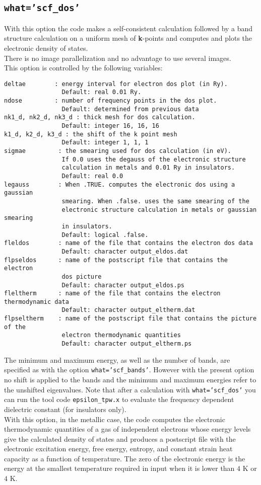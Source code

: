 \documentclass[12pt,a4paper]{article}
\begin{document}
\subsection{\color{web-blue}\texttt{what='scf\_dos'}}
With this option the code makes a self-consistent calculation followed
by a band structure calculation on a uniform mesh of {\bf k}-points and
computes and plots the electronic density of states. \\
There is no image parallelization and no advantage to use several images. \\
This option is controlled by the following variables:
\begin{verbatim} 
deltae        : energy interval for electron dos plot (in Ry).
                Default: real 0.01 Ry.
ndose         : number of frequency points in the dos plot.
                Default: determined from previous data
nk1_d, nk2_d, nk3_d : thick mesh for dos calculation.
                Default: integer 16, 16, 16
k1_d, k2_d, k3_d : the shift of the k point mesh
                Default: integer 1, 1, 1
sigmae         : the smearing used for dos calculation (in eV).
                If 0.0 uses the degauss of the electronic structure
                calculation in metals and 0.01 Ry in insulators.
                Default: real 0.0 
legauss        : When .TRUE. computes the electronic dos using a gaussian
                smearing. When .false. uses the same smearing of the
                electronic structure calculation in metals or gaussian smearing
                in insulators.
                Default: logical .false.
fleldos        : name of the file that contains the electron dos data
                Default: character output_eldos.dat
flpseldos      : name of the postscript file that contains the electron 
                dos picture
                Default: character output_eldos.ps
fleltherm      : name of the file that contains the electron thermodynamic data 
                Default: character output_eltherm.dat
flpseltherm    : name of the postscript file that contains the picture of the
                electron thermodynamic quantities
                Default: character output_eltherm.ps
\end{verbatim}
The minimum and maximum energy, as well as the number of bands,
are specified as with the option \texttt{what='scf\_bands'}.
However with the present option no shift is applied to the bands
and the minimum and maximum energies refer to the unshifted eigenvalues.
Note that after a calculation with \texttt{what='scf\_dos'} you can
run the tool code \texttt{epsilon\_tpw.x} to evaluate the frequency
dependent dielectric constant (for insulators only). \\
With this option, in the metallic case, 
the code computes the electronic thermodynamic quantities of
a gas of independent electrons whose energy levels give the calculated 
density of states and produces a postscript file
with the electronic excitation energy, free energy, entropy,
and constant strain heat capacity as a function of temperature. 
The zero of the electronic energy is the energy at the smallest temperature 
required in input when it is lower than $4$ K or $4$ K. \\
\end{document}
